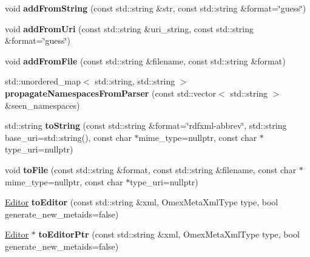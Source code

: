 \begin{DoxyCompactItemize}
void {\bfseries add\+From\+String} (const std\+::string \&str, const std\+::string \&format=\char`\"{}guess\char`\"{})
\item 
\mbox{\label{classomexmeta_1_1RDF_af99201be3782319d32e963ca7bed5b2b}} 
void {\bfseries add\+From\+Uri} (const std\+::string \&uri\+\_\+string, const std\+::string \&format=\char`\"{}guess\char`\"{})
\item 
\mbox{\label{classomexmeta_1_1RDF_ac88eeb1a0f6911a2c1e4c43cef1b9047}} 
void {\bfseries add\+From\+File} (const std\+::string \&filename, const std\+::string \&format)
\item 
\mbox{\label{classomexmeta_1_1RDF_af5f598560ab2a4ebe661f9bdb8665755}} 
std\+::unordered\+\_\+map$<$ std\+::string, std\+::string $>$ {\bfseries propagate\+Namespaces\+From\+Parser} (const std\+::vector$<$ std\+::string $>$ \&seen\+\_\+namespaces)
\item 
\mbox{\label{classomexmeta_1_1RDF_aca5e83398eb1739c02c7ab4852e09784}} 
std\+::string {\bfseries to\+String} (const std\+::string \&format=\char`\"{}rdfxml-\/abbrev\char`\"{}, std\+::string base\+\_\+uri=std\+::string(), const char $\ast$mime\+\_\+type=nullptr, const char $\ast$type\+\_\+uri=nullptr)
\item 
\mbox{\label{classomexmeta_1_1RDF_aa2348d3e28641a2b1079fddcacfd50dd}} 
void {\bfseries to\+File} (const std\+::string \&format, const std\+::string \&filename, const char $\ast$mime\+\_\+type=nullptr, const char $\ast$type\+\_\+uri=nullptr)
\item 
\mbox{\label{classomexmeta_1_1RDF_a1766b940e69990ce28b60309615c12ce}} 
\hyperlink{classomexmeta_1_1Editor}{Editor} {\bfseries to\+Editor} (const std\+::string \&xml, Omex\+Meta\+Xml\+Type type, bool generate\+\_\+new\+\_\+metaids=false)
\item 
\mbox{\label{classomexmeta_1_1RDF_aabdb57f01b0e83a4ac93e9548387cda9}} 
\hyperlink{classomexmeta_1_1Editor}{Editor} $\ast$ {\bfseries to\+Editor\+Ptr} (const std\+::string \&xml, Omex\+Meta\+Xml\+Type type, bool generate\+\_\+new\+\_\+metaids=false)
\item 

\end{DoxyCompactItemize}
